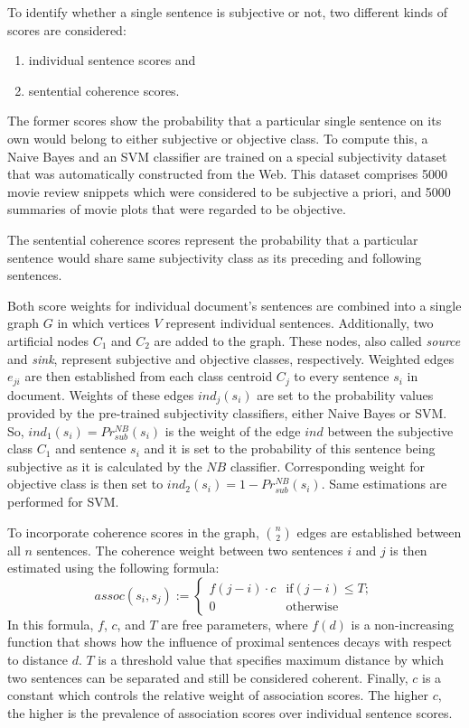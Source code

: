 \documentclass[a4paper,11pt]{article}
\begin{document}
To identify whether a single sentence is subjective or not, two
different kinds of scores are considered:
\begin{enumerate}
  \item individual sentence scores and
  \item sentential coherence scores.
\end{enumerate}
The former scores show the probability that a particular single
sentence on its own would belong to either subjective or objective
class.  To compute this, a Naive Bayes and an SVM classifier are
trained on a special subjectivity dataset that was automatically
constructed from the Web.  This dataset comprises 5000 movie review
snippets which were considered to be subjective a priori, and 5000
summaries of movie plots that were regarded to be objective.

The sentential coherence scores represent the probability that a
particular sentence would share same subjectivity class as its
preceding and following sentences.

Both score weights for individual document's sentences are combined
into a single graph $G$ in which vertices $V$ represent individual
sentences.  Additionally, two artificial nodes $C_1$ and $C_2$ are
added to the graph.  These nodes, also called \textit{source} and
\textit{sink}, represent subjective and objective classes,
respectively.  Weighted edges \textit{$e_{ji}$} are then established
from each class centroid $C_j$ to every sentence $s_i$ in document.
Weights of these edges $ind_j(s_i)$ are set to the probability values
provided by the pre-trained subjectivity classifiers, either Naive
Bayes or SVM.  So, $ind_1(s_i) = Pr^{NB}_{sub}(s_i)$ is the weight of
the edge $ind$ between the subjective class $C_1$ and sentence $s_i$
and it is set to the probability of this sentence being subjective as
it is calculated by the $NB$ classifier.  Corresponding weight for
objective class is then set to $ind_2(s_i) = 1 - Pr^{NB}_{sub}(s_i)$.
Same estimations are performed for SVM.

To incorporate coherence scores in the graph, $\binom{n}{2}$ edges are
established between all $n$ sentences.  The coherence weight between
two sentences $i$ and $j$ is then estimated using the following formula:
\begin{displaymath}
  assoc(s_i, s_j) := \begin{cases}
    f(j -i) \cdot c & \text{if} (j - i) \leq T;\\
   0 & \text{otherwise}
  \end{cases}
\end{displaymath}
In this formula, $f$, $c$, and $T$ are free parameters, where $f(d)$
is a non-increasing function that shows how the influence of proximal
sentences decays with respect to distance $d$.  $T$ is a threshold
value that specifies maximum distance by which two sentences can be
separated and still be considered coherent.  Finally, $c$ is a
constant which controls the relative weight of association scores.
The higher $c$, the higher is the prevalence of association scores
over individual sentence scores.
\end{document}
